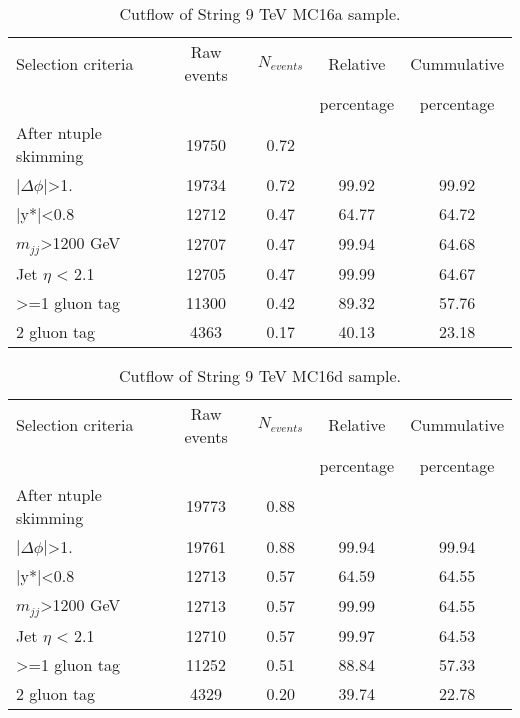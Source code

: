 \begin{table}[ht]
\begin{center}
\begin{tabular}{|l|c|c|c|c|}
\hline
Selection criteria & Raw events & $N_{events}$ & Relative & Cummulative \\
 & & & percentage & percentage \\
\hline
After ntuple skimming & 19750 & 0.72 &  &  \\
$|\Delta\phi|$>1. & 19734 & 0.72 & 99.92 & 99.92 \\
|y*|<0.8 & 12712 & 0.47 & 64.77 & 64.72 \\
$m_{jj}$>1200 GeV & 12707 & 0.47 & 99.94 & 64.68 \\
Jet $\eta$ < 2.1 & 12705 & 0.47 & 99.99 & 64.67 \\
>=1 gluon tag & 11300 & 0.42 & 89.32 & 57.76 \\
2 gluon tag & 4363 & 0.17 & 40.13 & 23.18 \\
\hline
\end{tabular}
\end{center}
\caption{Cutflow of String 9 TeV MC16a sample.}
\end{table}

\begin{table}[ht]
\begin{center}
\begin{tabular}{|l|c|c|c|c|}
\hline
Selection criteria & Raw events & $N_{events}$ & Relative & Cummulative \\
 & & & percentage & percentage \\
\hline
After ntuple skimming & 19773 & 0.88 &  &  \\
$|\Delta\phi|$>1. & 19761 & 0.88 & 99.94 & 99.94 \\
|y*|<0.8 & 12713 & 0.57 & 64.59 & 64.55 \\
$m_{jj}$>1200 GeV & 12713 & 0.57 & 99.99 & 64.55 \\
Jet $\eta$ < 2.1 & 12710 & 0.57 & 99.97 & 64.53 \\
>=1 gluon tag & 11252 & 0.51 & 88.84 & 57.33 \\
2 gluon tag & 4329 & 0.20 & 39.74 & 22.78 \\
\hline
\end{tabular}
\end{center}
\caption{Cutflow of String 9 TeV MC16d sample.}
\end{table}

